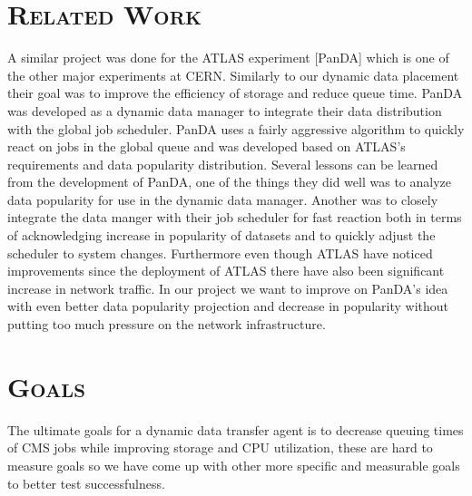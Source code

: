 \documentclass[11pt,a4page]{article}
\begin{document}
\section{\textsc{Related Work}}

A similar project was done for the ATLAS experiment [PanDA] which is one of the other major experiments at CERN. Similarly to our dynamic data placement their goal was to improve the efficiency of storage and reduce queue time. PanDA was developed as a dynamic data manager to integrate their data distribution with the global job scheduler. PanDA uses a fairly aggressive algorithm to quickly react on jobs in the global queue and was developed based on ATLAS's requirements and data popularity distribution. Several lessons can be learned from the development of PanDA, one of the things they did well was to analyze data popularity for use in the dynamic data manager. Another was to closely integrate the data manger with their job scheduler for fast reaction both in terms of acknowledging increase in popularity of datasets and to quickly adjust the scheduler to system changes. Furthermore even though ATLAS have noticed improvements since the deployment of ATLAS there have also been significant increase in network traffic. In our project we want to improve on PanDA's idea with even better data popularity projection and decrease in popularity without putting too much pressure on the network infrastructure.


\section{\textsc{Goals}}

  The ultimate goals for a dynamic data transfer agent is to decrease queuing times of CMS jobs while improving storage and CPU utilization, these are hard to measure goals so we have come up with other more specific and measurable goals to better test successfulness.
\end{document}
